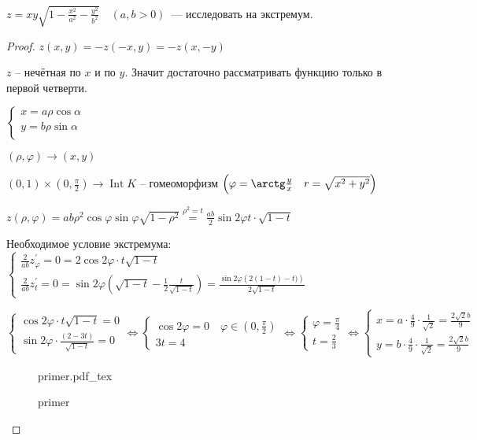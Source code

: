 \documentclass{book}
\newcommand{\p}[1]{#1^{\prime}}
\theoremstyle{definition}
\newcommand{\incfig}[1]{%
    \def\svgwidth{\columnwidth}
    {#1.pdf_tex}
}
\DeclareMathOperator{\Int}{Int}
\begin{document}
        \begin{problem}
            $z = xy\sqrt{1 - \frac{x^2}{a^2} - \frac{y^2}{b^2}}\quad (a, b>0) $~--- исследовать на экстремум.
        \end{problem}
        \begin{proof}

            $z(x, y) = -z(-x, y) = -z(x, -y)$

            $z$ -- нечётная по  $x$ и по  $y$. 
            Значит достаточно рассматривать функцию только в первой четверти.
            
            $\begin{cases}
            x = a\rho \cos \alpha\\
            y = b\rho \sin \alpha\\
            \end{cases}$

            $(\rho, \varphi) \to (x, y)$

            $(0,1) \times (0, \frac{\pi}{2}) \to \Int K$ -- гомеоморфизм $\left( \varphi = \arctg \frac{y}{x}\quad r = \sqrt{x^2+y^2}  \right) $ 
            
            $z(\rho, \varphi) = ab\rho^2\cos \varphi \sin \varphi \sqrt{1-\rho^2} \overset{\rho^2=t} = \frac {ab} 2 \sin 2\varphi t\cdot \sqrt{1-t} $

            Необходимое условие экстремума: $\begin{cases}
                \frac{2}{ab} \p z_{\varphi} = 0 = 2\cos 2\varphi\cdot t\sqrt{1-t}\\
                \frac{2}{ab}\p z_{t} = 0 = \sin 2\varphi\left( \sqrt{1-t} -\frac{1}{2} \frac{t}{\sqrt{1-t} } \right) = \frac{\sin 2\varphi \left( 2(1-t)-t) \right) }{2\sqrt{1-t} } 
            \end{cases}$ 

            $\begin{cases}
                 \cos 2\varphi \cdot  t\sqrt{1-t} = 0\\
                 \sin 2\varphi \cdot  \frac{(2-3t)}{\sqrt{1-t} } = 0
            \end{cases} \iff  \begin{cases}
            \cos 2\varphi = 0\quad \varphi \in (0, \frac{\pi}{2})\\
                3t = 4
            \end{cases} \iff  \begin{cases}
                \varphi = \frac{\pi}{4}\\
                t = \frac{2}{3}
            \end{cases} \iff  \begin{cases}
                x = a\cdot \frac{4}{9}\cdot \frac{1}{\sqrt{2} } = \frac{2\sqrt{2}b }{9}\\
                y = b \cdot  \frac{4}{9}\cdot \frac{1}{\sqrt{2} } = \frac{2\sqrt{2} b}{9}
            \end{cases}$

\begin{figure}[!ht]
    \centering
    \incfig{primer}
    \caption{primer}
    \label{fig:primer}
\end{figure}
        \end{proof}
\end{document}
